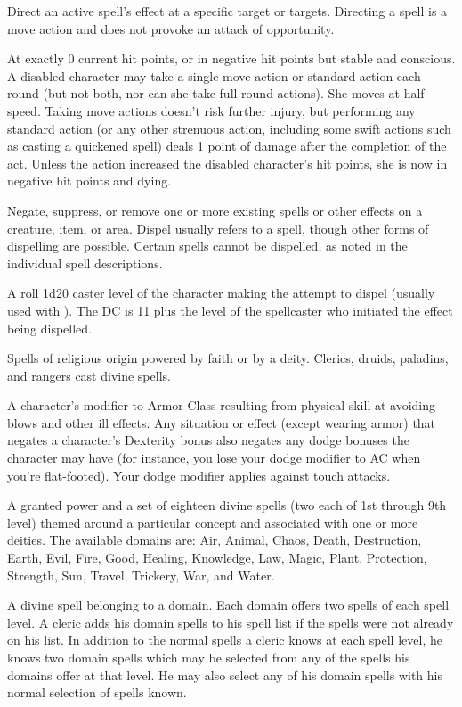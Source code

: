  Direct an active spell's effect at a specific target or 
targets. Directing a spell is a move action and does not provoke an 
attack of opportunity. 

 At exactly 0 current hit points, or in negative hit points 
but stable and conscious. A disabled character may take a single 
move action or standard action each round (but not both, nor can 
she take full-round actions). She moves at half speed. Taking move 
actions doesn't risk further injury, but performing any standard 
action (or any other strenuous action, including 
some swift actions such as casting a quickened spell) deals 1 point of 
damage after the completion of the act. Unless the action increased 
the disabled character's hit points, she is now in negative hit points 
and dying. 

 Negate, suppress, or remove one or more existing spells 
or other effects on a creature, item, or area. Dispel usually refers to a 
 spell, though other forms of dispelling are possible. 
Certain spells cannot be dispelled, as noted in the individual spell 
descriptions. 

 A roll 1d20 \add caster level of the character making 
the attempt to dispel (usually used with ). The DC is 11 
plus the level of the spellcaster who initiated the effect being 
dispelled. 

 Spells of religious origin powered by faith or by a 
deity. Clerics, druids, paladins, and rangers cast divine spells. 

 A character's modifier to Armor Class resulting from physical skill at avoiding blows and other ill effects. Any situation or effect (except wearing armor) that negates a character's Dexterity bonus also negates any dodge bonuses the character may have (for instance, you lose your dodge modifier to AC when you're flat-footed). Your dodge modifier applies against touch attacks. 

 A granted power and a set of eighteen divine spells (two each of 1st through 9th level) themed around a particular concept 
and associated with one or more deities. The available domains are:
Air, Animal, Chaos, Death, Destruction, Earth, Evil, Fire, Good, 
Healing, Knowledge, Law, Magic, Plant, Protection, Strength, 
Sun, Travel, Trickery, War, and Water. 

 A divine spell belonging to a domain. Each domain offers two spells of each spell level. A cleric adds his domain spells to his spell list if the spells were not already on his list. In addition to the normal spells a cleric knows at each spell level, he knows two domain spells which may be selected from any of the spells his domains offer at that level. He may also select any of his domain spells with his normal selection of spells known.

